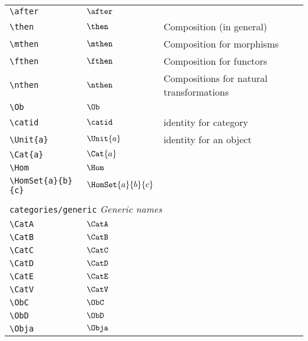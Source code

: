 \begin{longtable}{lll}
 \hline
{\color[rgb]{0.5,0.5,0.5}\texttt{\textbackslash after}} & $\after$ & \\ 
 {\color[rgb]{0.5,0.5,0.5}\texttt{\textbackslash then}} & $\then$ &  Composition (in general)\\ 
 {\color[rgb]{0.5,0.5,0.5}\texttt{\textbackslash mthen}} & $\mthen$ &  Composition for morphisms\\ 
 {\color[rgb]{0.5,0.5,0.5}\texttt{\textbackslash fthen}} & $\fthen$ &  Composition for functors\\ 
 {\color[rgb]{0.5,0.5,0.5}\texttt{\textbackslash nthen}} & $\nthen$ &  Compositions for natural transformations\\ 
 {\color[rgb]{0.5,0.5,0.5}\texttt{\textbackslash Ob}} & $\Ob$ & \\ 
 {\color[rgb]{0.5,0.5,0.5}\texttt{\textbackslash catid}} & $\catid$ &  identity for category\\ 
 {\color[rgb]{0.5,0.5,0.5}\texttt{\textbackslash Unit\{a\}}} & $\Unit{a}$ &  identity for an object\\ 
 {\color[rgb]{0.5,0.5,0.5}\texttt{\textbackslash Cat\{a\}}} & $\Cat{a}$ & \\ 
 {\color[rgb]{0.5,0.5,0.5}\texttt{\textbackslash Hom}} & $\Hom$ & \\ 
 {\color[rgb]{0.5,0.5,0.5}\texttt{\textbackslash HomSet\{a\}\{b\}\{c\}}} & $\HomSet{a}{b}{c}$ & \\ 
  &  & \\ 
 \multicolumn{3}{l}{{\color[rgb]{0.5,0.5,0.5}\texttt{categories/generic}} \emph{Generic names}}\\ 
 \hline
{\color[rgb]{0.5,0.5,0.5}\texttt{\textbackslash CatA}} & $\CatA$ & \\ 
 {\color[rgb]{0.5,0.5,0.5}\texttt{\textbackslash CatB}} & $\CatB$ & \\ 
 {\color[rgb]{0.5,0.5,0.5}\texttt{\textbackslash CatC}} & $\CatC$ & \\ 
 {\color[rgb]{0.5,0.5,0.5}\texttt{\textbackslash CatD}} & $\CatD$ & \\ 
 {\color[rgb]{0.5,0.5,0.5}\texttt{\textbackslash CatE}} & $\CatE$ & \\ 
 {\color[rgb]{0.5,0.5,0.5}\texttt{\textbackslash CatV}} & $\CatV$ & \\ 
 {\color[rgb]{0.5,0.5,0.5}\texttt{\textbackslash ObC}} & $\ObC$ & \\ 
 {\color[rgb]{0.5,0.5,0.5}\texttt{\textbackslash ObD}} & $\ObD$ & \\ 
 {\color[rgb]{0.5,0.5,0.5}\texttt{\textbackslash Obja}} & $\Obja$ & \\ 

\end{longtable}
